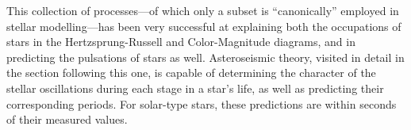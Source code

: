 
This collection of processes---of which only a subset is ``canonically'' employed in stellar modelling---has been very successful at explaining both the occupations of stars in the Hertzsprung-Russell and Color-Magnitude diagrams, and in predicting the pulsations of stars as well. 
Asteroseismic theory, visited in detail in the section following this one, is capable of determining the character of the stellar oscillations during each stage in a star's life, as well as predicting their corresponding periods. For solar-type stars, these predictions are within seconds of their measured values. 


